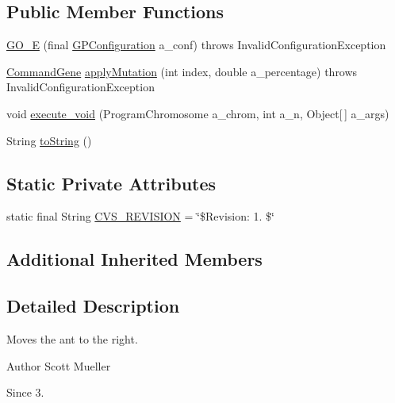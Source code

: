 \subsection*{Public Member Functions}
\begin{DoxyCompactItemize}
\item 
\hyperlink{classexamples_1_1gp_1_1painted_desert_1_1_g_o___e_af06a3f8c7747a6ee911bdfa4aed9aa42}{G\-O\-\_\-\-E} (final \hyperlink{classorg_1_1jgap_1_1gp_1_1impl_1_1_g_p_configuration}{G\-P\-Configuration} a\-\_\-conf)  throws Invalid\-Configuration\-Exception 
\item 
\hyperlink{classorg_1_1jgap_1_1gp_1_1_command_gene}{Command\-Gene} \hyperlink{classexamples_1_1gp_1_1painted_desert_1_1_g_o___e_ab514a871fc60b9a51c28bdf81f568f26}{apply\-Mutation} (int index, double a\-\_\-percentage)  throws Invalid\-Configuration\-Exception 
\item 
void \hyperlink{classexamples_1_1gp_1_1painted_desert_1_1_g_o___e_a5b11c4eba26c9d26d2109e55bb5b4b88}{execute\-\_\-void} (Program\-Chromosome a\-\_\-chrom, int a\-\_\-n, Object\mbox{[}$\,$\mbox{]} a\-\_\-args)
\item 
String \hyperlink{classexamples_1_1gp_1_1painted_desert_1_1_g_o___e_ad0ca441aed37e41eef6dfda54c25457b}{to\-String} ()
\end{DoxyCompactItemize}
\subsection*{Static Private Attributes}
\begin{DoxyCompactItemize}
\item 
static final String \hyperlink{classexamples_1_1gp_1_1painted_desert_1_1_g_o___e_a5bc33515947936865e03b089e63d8c0d}{C\-V\-S\-\_\-\-R\-E\-V\-I\-S\-I\-O\-N} = \char`\"{}\$Revision\-: 1. \$\char`\"{}
\end{DoxyCompactItemize}
\subsection*{Additional Inherited Members}


\subsection{Detailed Description}
Moves the ant to the right.

\begin{DoxyAuthor}{Author}
Scott Mueller 
\end{DoxyAuthor}
\begin{DoxySince}{Since}
3. 
\end{DoxySince}


